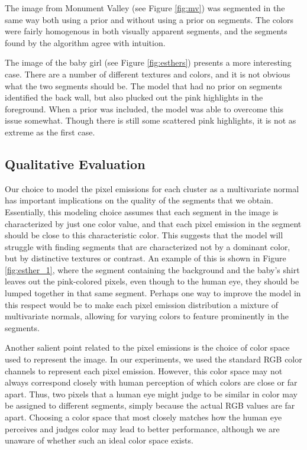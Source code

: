 \documentclass[12pt]{article}
\begin{document}
The image from Monument Valley (see Figure \ref{fig:mv}) was segmented in the
same way both using a prior and without using a prior on segments. The colors
were fairly homogenous in both visually apparent segments, and the segments
found by the algorithm agree with intuition.

The image of the baby girl (see Figure \ref{fig:esthers}) presents a more
interesting case. There are a number of different textures and colors, and it
is not obvious what the two segments should be. The model that had no prior on
segments identified the back wall, but also plucked out the pink highlights in
the foreground. When a prior was included, the model was able to overcome this
issue somewhat. Though there is still some scattered pink highlights, it is not
as extreme as the first case.


\subsection*{Qualitative Evaluation}
Our choice to model the pixel emissions for each cluster as a multivariate normal has important
implications on the quality of the segments that we obtain.
Essentially, this modeling choice assumes that each segment in the image is characterized by just one
color value, and that each pixel emission in the segment should be close to this characteristic
color. This suggests that the model will struggle with finding segments that are characterized
not by a dominant color, but by distinctive textures or contrast. 
An example of this is shown in Figure \ref{fig:esther_1}, where the segment containing the background
and the baby's shirt leaves out the pink-colored pixels, even though to the human eye, they should be
lumped together in that same segment.
Perhaps one way to improve the model in this respect would be to make each
pixel emission distribution a mixture of multivariate normals, allowing for varying colors to feature
prominently in the segments.

Another salient point related to the pixel emissions is the choice of color space used to represent
the image.
In our experiments, we used the standard RGB color channels to represent each pixel emission.
However, this color space may not always correspond closely with human perception of which colors are
close or far apart.
Thus, two pixels that a human eye might judge to be similar in color may be assigned to different
segments, simply because the actual RGB values are far apart.
Choosing a color space that most closely matches how the human eye perceives and judges color may
lead to better performance, although we are unaware of whether such an ideal color space exists.
\end{document}

